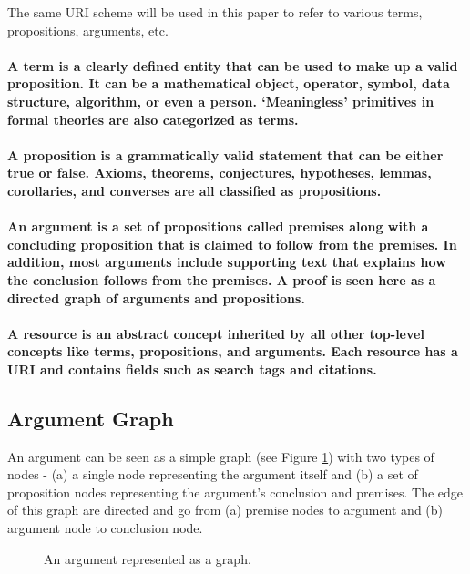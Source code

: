 \documentclass[a4paper]{article}
\begin{document}
The same URI scheme will be used in this paper to refer to various terms, propositions, arguments, etc.

\paragraph{A \textbf{term} is a clearly defined entity that can be used to make up a valid proposition. It can be a mathematical object, operator, symbol, data structure, algorithm, or even a person. `Meaningless' primitives in formal theories are also categorized as terms.}

\paragraph{A \textbf{proposition} is a grammatically valid statement that can be either true or false. Axioms, theorems, conjectures, hypotheses, lemmas, corollaries, and converses are all classified as propositions.}

\paragraph{An \textbf{argument} is a set of propositions called premises along with a concluding proposition that is claimed to follow from the premises. In addition, most arguments include supporting text that explains how the conclusion follows from the premises. A proof is seen here as a directed graph of arguments and propositions.}

\paragraph{A \textbf{resource} is an abstract concept inherited by all other top-level concepts like terms, propositions, and arguments. Each resource has a URI and contains fields such as search tags and citations.}

\subsection{Argument Graph}
An argument can be seen as a simple graph (see Figure \ref{argument}) with two types of nodes - (a) a single node representing the argument itself and (b) a set of proposition nodes representing the argument's conclusion and premises. The edge of this graph are directed and go from (a) premise nodes to argument and (b) argument node to conclusion node.

\begin{figure}[ht]
\begin{center}
\caption{An argument represented as a graph.}
\label{argument}
\end{center}
\end{figure}
\end{document}
